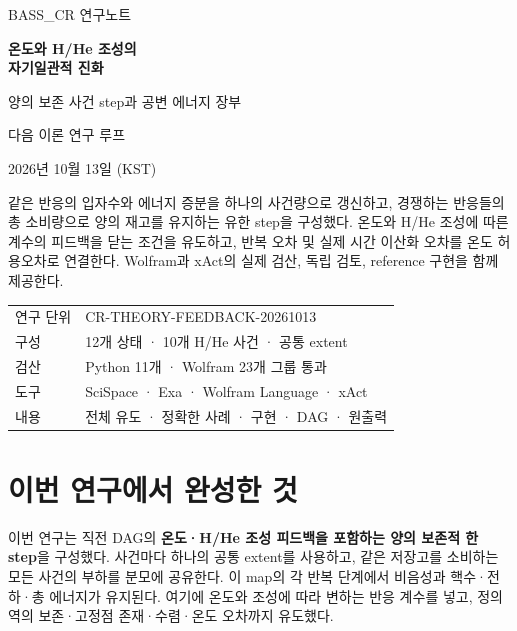 \documentclass[11pt,a4paper]{article}
\begin{document}
\begin{titlepage}
{\color{MidnightBlue}\large BASS\_CR 연구노트\par}
\vspace{16mm}
{\Huge\bfseries 온도와 H/He 조성의\\[3mm]자기일관적 진화\par}
\vspace{8mm}
{\Large 양의 보존 사건 step과 공변 에너지 장부\par}
\vspace{12mm}
{\large 다음 이론 연구 루프\par}
\vspace{4mm}
{2026년 10월 13일 (KST)\par}
\vspace{12mm}
\begin{minipage}{.96\textwidth}
\large
같은 반응의 입자수와 에너지 증분을 하나의 사건량으로 갱신하고,
경쟁하는 반응들의 총 소비량으로 양의 재고를 유지하는 유한 step을 구성했다.
온도와 H/He 조성에 따른 계수의 피드백을 닫는 조건을 유도하고,
반복 오차 및 실제 시간 이산화 오차를 온도 허용오차로 연결한다.
Wolfram과 xAct의 실제 검산, 독립 검토, reference 구현을 함께 제공한다.
\end{minipage}
\vfill
\begin{tabular}{@{}ll@{}}
연구 단위 & CR-THEORY-FEEDBACK-20261013\\
구성 & 12개 상태 · 10개 H/He 사건 · 공통 extent\\
검산 & Python 11개 · Wolfram 23개 그룹 통과\\
도구 & SciSpace · Exa · Wolfram Language · xAct\\
내용 & 전체 유도 · 정확한 사례 · 구현 · DAG · 원출력\\
\end{tabular}
\end{titlepage}
\tableofcontents
\clearpage
\hypertarget{uxc774uxbc88-uxc5f0uxad6cuxc5d0uxc11c-uxc644uxc131uxd55c-uxac83}{%
\section{이번 연구에서 완성한 것}\label{uxc774uxbc88-uxc5f0uxad6cuxc5d0uxc11c-uxc644uxc131uxd55c-uxac83}}

이번 연구는 직전 DAG의 \textbf{온도·H/He 조성 피드백을 포함하는 양의 보존적 한 step}을 구성했다. 사건마다 하나의 공통 extent를 사용하고, 같은 저장고를 소비하는 모든 사건의 부하를 분모에 공유한다. 이 map의 각 반복 단계에서 비음성과 핵수·전하·총 에너지가 유지된다. 여기에 온도와 조성에 따라 변하는 반응 계수를 넣고, 정의역의 보존·고정점 존재·수렴·온도 오차까지 유도했다.
\end{document}
